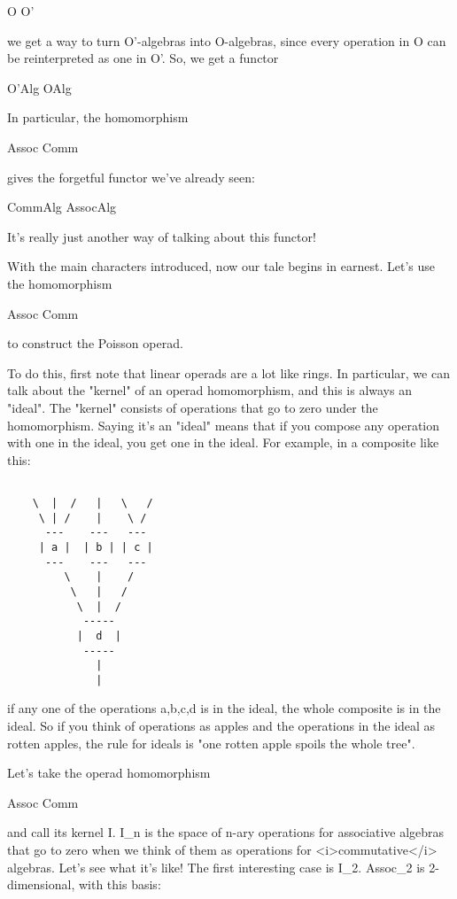 O \to  O'

we get a way to turn O'-algebras into O-algebras, since every
operation in O can be reinterpreted as one in O'.  So, we get a
functor

O'Alg \to  OAlg

In particular, the homomorphism

Assoc \to  Comm

gives the forgetful functor we've already seen:

CommAlg \to  AssocAlg

It's really just another way of talking about this functor!

With the main characters introduced, now our tale begins in earnest.
Let's use the homomorphism

Assoc \to  Comm 

to construct the Poisson operad.

To do this, first note that linear operads are a lot like rings.  In
particular, we can talk about the "kernel" of an operad
homomorphism, and this is always an "ideal".  The
"kernel" consists of operations that go to zero under the
homomorphism.  Saying it's an "ideal" means that if you
compose any operation with one in the ideal, you get one in the ideal.
For example, in a composite like this:


\begin{verbatim}

    \  |  /   |   \   /    
     \ | /    |    \ /    
      ---    ---   ---   
     | a |  | b | | c | 
      ---    ---   --- 
         \    |    /
          \   |   /  
           \  |  / 
            ----- 
           |  d  |  
            -----  
              |   
              |  
\end{verbatim}
    
if any one of the operations a,b,c,d is in the ideal, the whole
composite is in the ideal.  So if you think of operations as
apples and the operations in the ideal as rotten apples, the rule 
for ideals is "one rotten apple spoils the whole
tree".  

Let's take the operad homomorphism

Assoc \to  Comm

and call its kernel I.  I_{n} is the space of n-ary operations
for associative algebras that go to zero when we think of them as
operations for <i>commutative</i> algebras.  Let's see what it's like!
The first interesting case is I_{2}.  Assoc_{2} is
2-dimensional, with this basis:

